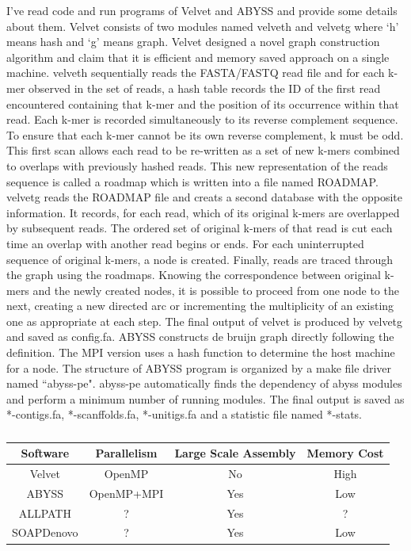\documentclass{article}
\begin{document}
I've read code and run programs of Velvet and ABYSS and provide some details about them. Velvet consists of two modules named velveth and velvetg where `h' means hash and `g' means graph. Velvet designed a novel graph construction algorithm and claim that it is efficient and memory saved approach on a single machine. velveth sequentially reads the FASTA/FASTQ read file and for each k-mer observed in the set of reads, a hash table records the ID of the first read encountered containing that k-mer and the position of its occurrence within that read. Each k-mer is recorded simultaneously to its reverse complement sequence. To ensure that each k-mer cannot be its own reverse complement, k must be odd. This first scan allows each read to be re-written as a set of new k-mers combined to overlaps with previously hashed reads. This new representation of the reads sequence is called a roadmap which is written into a file named ROADMAP. velvetg reads the ROADMAP file and creats a second database with the opposite information. It records, for each read, which of its original k-mers are overlapped by subsequent reads. The ordered set of original k-mers of that read is cut each time an overlap with another read begins or ends. For each uninterrupted sequence of original k-mers, a node is created. Finally, reads are traced through the graph using the roadmaps. Knowing the correspondence between original k-mers and the newly created nodes, it is possible to proceed from one node to the next, creating a new directed arc or incrementing the multiplicity of an existing one as appropriate at each step. The final output of velvet is produced by velvetg and saved as config.fa. ABYSS constructs de bruijn graph directly following the definition. The MPI version uses a hash function to determine the host machine for a node. The structure of ABYSS program is organized by a make file driver named ``abyss-pe". abyss-pe automatically finds the dependency of abyss modules and perform a minimum number of running modules. The final output is saved as *-contigs.fa, *-scanffolds.fa, *-unitigs.fa and a statistic file named *-stats.\\
\begin{table}[ht]
\begin{center}
\caption{}\label{comparison_of_assemblers}
\begin{tabular}{c|c|c|c}
\hline
Software & Parallelism & Large Scale Assembly & Memory Cost\\
\hline
Velvet & OpenMP & No & High\\
\hline
ABYSS & OpenMP+MPI & Yes & Low\\
\hline
ALLPATH& ? & Yes & ?\\
\hline
SOAPDenovo & ? & Yes &Low\\
\hline
\end{tabular}
\end{center}
\end{table}
\end{document}
